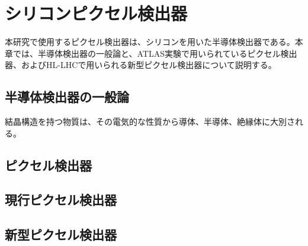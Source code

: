 \chapter{シリコンピクセル検出器}
\label{sec:chap2}
本研究で使用するピクセル検出器は、シリコンを用いた半導体検出器である。本章では、半導体検出器の一般論と、ATLAS実験で用いられているピクセル検出器、およびHL-LHCで用いられる新型ピクセル検出器について説明する。





\section{半導体検出器の一般論}
\label{sec:handoutai}
結晶構造を持つ物質は、その電気的な性質から導体、半導体、絶縁体に大別される。







\section{ピクセル検出器}
\label{sec:pixelkenshutuki}











\section{現行ピクセル検出器}
\label{sec:genkoupixel}






\section{新型ピクセル検出器}
\label{sec:singatapixel}





\newpage
